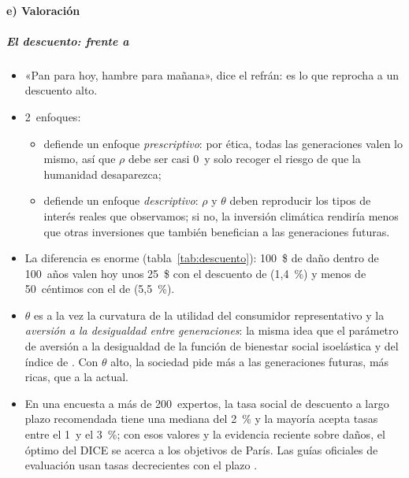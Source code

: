 \documentclass[11pt]{article}
\begin{document}
\paragraph{e) Valoración}

\subparagraph{El descuento:  frente a }

\begin{itemize}
\item «Pan para hoy, hambre para mañana», dice el refrán: es lo que  reprocha a un descuento alto.
\item 2~enfoques:
  \begin{itemize}
  \item {} defiende un enfoque \emph{prescriptivo}: por ética, todas las generaciones valen lo mismo, así que $\rho$ debe ser casi 0~y solo recoger el riesgo de que la humanidad desaparezca\nocite{Stern2007Economics};
  \item {} defiende un enfoque \emph{descriptivo}: $\rho$ y $\theta$ deben reproducir los tipos de interés reales que observamos; si no, la inversión climática rendiría menos que otras inversiones que también benefician a las generaciones futuras\nocite{Nordhaus2007Review}.
  \end{itemize}
\item La diferencia es enorme (tabla~\ref{tab:descuento}): 100~\$ de daño dentro de 100~años valen hoy unos 25~\$ con el descuento de  (1,4~\%) y menos de 50~céntimos con el de  (5,5~\%).
\item $\theta$ es a la vez la curvatura de la utilidad del consumidor representativo y la \emph{aversión a la desigualdad entre generaciones}: la misma idea que el parámetro de aversión a la desigualdad de la función de bienestar social isoelástica y del índice de  . Con $\theta$ alto, la sociedad pide más a las generaciones futuras, más ricas, que a la actual.
\item En una encuesta a más de 200~expertos, la tasa social de descuento a largo plazo recomendada tiene una mediana del 2~\% y la mayoría acepta tasas entre el 1~y el 3~\%\nocite{Drupp2018Discounting}; con esos valores y la evidencia reciente sobre daños, el óptimo del DICE se acerca a los objetivos de París\nocite{Hansel2020Climate}. Las guías oficiales de evaluación usan tasas decrecientes con el plazo .
\end{itemize}
\end{document}
